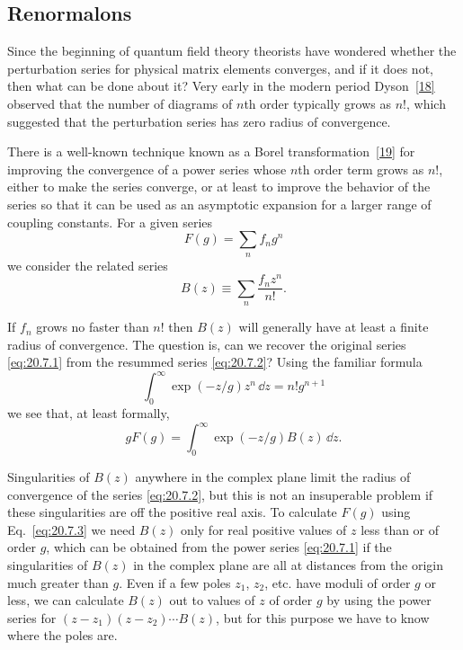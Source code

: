 
\subsection[Renormalons]{Renormalons\footnotemark}
\label{sec:20.7}

Since the beginning of quantum field theory theorists have wondered whether the perturbation series for physical matrix elements converges, and if it does not, then what can be done about it? Very early in the modern period Dyson~\hyperref[ch20-ref-18]{[18]} observed that the number of diagrams of $n$th order typically grows as $n!$, which suggested that the perturbation series has zero radius of convergence.

There is a well-known technique known as a Borel transformation~\hyperref[ch20-ref-19]{[19]} for improving the convergence of a power series whose $n$th order term grows as $n!$, either to make the series converge, or at least to improve the behavior of the series so that it can be used as an asymptotic expansion for a larger range of coupling constants. For a given series
\begin{equation}
F(g)=\sum_n f_n g^n
\tag{20.7.1}\label{eq:20.7.1}
\end{equation}
we consider the related series
\begin{equation}
B(z)\equiv\sum_n\frac{f_nz^n}{n!}.
\tag{20.7.2}\label{eq:20.7.2}
\end{equation}

If $f_n$ grows no faster than $n!$ then $B(z)$ will generally have at least a finite radius of convergence. The question is, can we recover the original series \eqref{eq:20.7.1} from the resummed series \eqref{eq:20.7.2}? Using the familiar formula
\[
\int_0^\infty \exp(-z/g)z^n\,\dd z=n!g^{n+1}
\]
we see that, at least formally,
\begin{equation}
gF(g)=\int_0^\infty \exp(-z/g)B(z)\,\dd z.
\tag{20.7.3}\label{eq:20.7.3}
\end{equation}

Singularities of $B(z)$ anywhere in the complex plane limit the radius of convergence of the series \eqref{eq:20.7.2}, but this is not an insuperable problem if these singularities are off the positive real axis. To calculate $F(g)$ using Eq.~\eqref{eq:20.7.3} we need $B(z)$ only for real positive values of $z$ less than or of order $g$, which can be obtained from the power series \eqref{eq:20.7.1} if the singularities of $B(z)$ in the complex plane are all at distances from the origin much greater than $g$. Even if a few poles $z_1$, $z_2$, etc. have moduli of order $g$ or less, we can calculate $B(z)$ out to values of $z$ of order $g$ by using the power series for $(z-z_1)(z-z_2)\cdots B(z)$, but for this purpose we have to know where the poles are.

